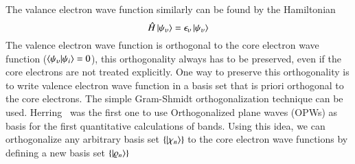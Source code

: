 The valance electron wave function similarly can be found by the Hamiltonian
\begin{equation}
\label{eq_val_hamil}
\hat{H}\ket{\psi_{\upsilon}} = \epsilon_{\upsilon} \ket{\psi_{\upsilon}}
\end{equation}
The valence electron wave function is orthogonal to the core electron wave function ($\braket{\psi_{\upsilon}}{\psi_i}=0$), this orthogonality always has to be preserved, even if the core electrons are not treated explicitly. One way to preserve this orthogonality is to write valence electron wave function in a basis set that is priori orthogonal to the core electrons. The simple Gram-Shmidt orthogonalization technique can be used. Herring~\cite{herring1940new} was the first one to use Orthogonalized plane waves (OPWs) as basis for the first quantitative calculations of bands. Using this idea, we can orthogonalize any arbitrary basis set $\{\ket{\chi_n}\}$ to the core electron wave functions by defining a new basis set $\{\ket{\varrho_n}\}$

